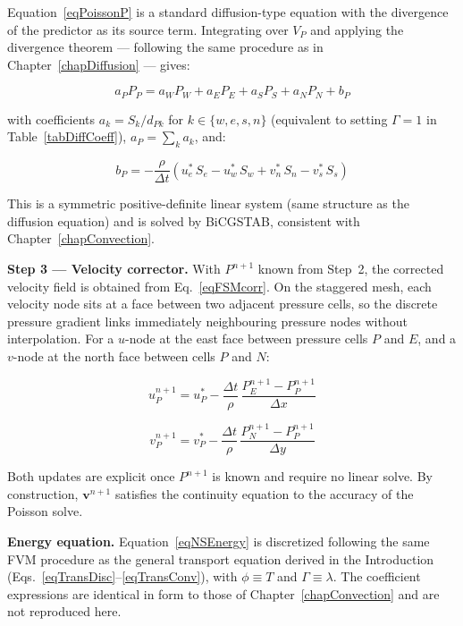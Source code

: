Equation~\eqref{eqPoissonP} is a standard diffusion-type equation with the divergence of the predictor as its source term. Integrating over $V_P$ and applying the divergence theorem — following the same procedure as in Chapter~\ref{chapDiffusion} — gives:

\begin{equation}\label{eqFSM2}
    a_P P_P = a_W P_W + a_E P_E + a_S P_S + a_N P_N + b_P
\end{equation}

with coefficients $a_k = S_k / d_{Pk}$ for $k \in \{w, e, s, n\}$ (equivalent to setting $\Gamma = 1$ in Table~\ref{tabDiffCoeff}), $a_P = \sum_k a_k$, and:

\begin{equation}\label{eqFSM2rhs}
    b_P = -\frac{\rho}{\Delta t}\left(u^*_e\,S_e - u^*_w\,S_w + v^*_n\,S_n - v^*_s\,S_s\right)
\end{equation}

This is a symmetric positive-definite linear system (same structure as the diffusion equation) and is solved by BiCGSTAB, consistent with Chapter~\ref{chapConvection}.

\textbf{Step 3 — Velocity corrector.} With $P^{n+1}$ known from Step~2, the corrected velocity field is obtained from Eq.~\eqref{eqFSMcorr}. On the staggered mesh, each velocity node sits at a face between two adjacent pressure cells, so the discrete pressure gradient links immediately neighbouring pressure nodes without interpolation. For a $u$-node at the east face between pressure cells $P$ and $E$, and a $v$-node at the north face between cells $P$ and $N$:

\begin{equation}\label{eqFSM3u}
    u^{n+1}_P = u^*_P - \frac{\Delta t}{\rho}\,\frac{P^{n+1}_E - P^{n+1}_P}{\Delta x}
\end{equation}

\begin{equation}\label{eqFSM3v}
    v^{n+1}_P = v^*_P - \frac{\Delta t}{\rho}\,\frac{P^{n+1}_N - P^{n+1}_P}{\Delta y}
\end{equation}

Both updates are explicit once $P^{n+1}$ is known and require no linear solve. By construction, $\mathbf{v}^{n+1}$ satisfies the continuity equation to the accuracy of the Poisson solve.

\textbf{Energy equation.} Equation~\eqref{eqNSEnergy} is discretized following the same FVM procedure as the general transport equation derived in the Introduction (Eqs.~\eqref{eqTransDisc}--\eqref{eqTransConv}), with $\phi \equiv T$ and $\Gamma \equiv \lambda$. The coefficient expressions are identical in form to those of Chapter~\ref{chapConvection} and are not reproduced here.


